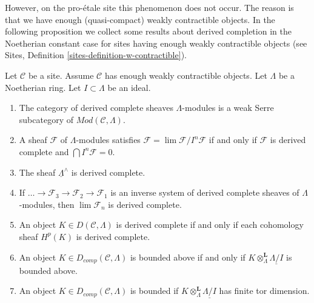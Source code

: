 \medskip\noindent
However, on the pro-\'etale site this phenomenon does not occur.
The reason is that we have enough (quasi-compact) weakly contractible objects.
In the following proposition we collect some results about derived
completion in the Noetherian constant case for sites having enough
weakly contractible objects (see
Sites, Definition \ref{sites-definition-w-contractible}).

\begin{proposition}
\label{proposition-enough-weakly-contractibles}
Let $\mathcal{C}$ be a site. Assume $\mathcal{C}$ has enough
weakly contractible objects.
Let $\Lambda$ be a Noetherian ring. Let $I \subset \Lambda$ be an ideal.
\begin{enumerate}
\item The category of derived complete sheaves $\Lambda$-modules is a
weak Serre subcategory of $\textit{Mod}(\mathcal{C}, \Lambda)$.
\item A sheaf $\mathcal{F}$ of $\Lambda$-modules satisfies
$\mathcal{F} = \lim \mathcal{F}/I^n\mathcal{F}$ if and only if
$\mathcal{F}$ is derived complete and $\bigcap I^n\mathcal{F} = 0$.
\item The sheaf $\underline{\Lambda}^\wedge$ is derived complete.
\item If $\ldots \to \mathcal{F}_3 \to \mathcal{F}_2 \to \mathcal{F}_1$
is an inverse system of derived complete sheaves of $\Lambda$-modules,
then $\lim \mathcal{F}_n$ is derived complete.
\item An object $K \in D(\mathcal{C}, \Lambda)$ is derived complete if
and only if each cohomology sheaf $H^p(K)$ is derived complete.
\item An object $K \in D_{comp}(\mathcal{C}, \Lambda)$ is bounded above
if and only if $K \otimes_\Lambda^\mathbf{L} \underline{\Lambda/I}$
is bounded above.
\item An object $K \in D_{comp}(\mathcal{C}, \Lambda)$ is bounded
if $K \otimes_\Lambda^\mathbf{L} \underline{\Lambda/I}$ has finite
tor dimension.
\end{enumerate}
\end{proposition}

